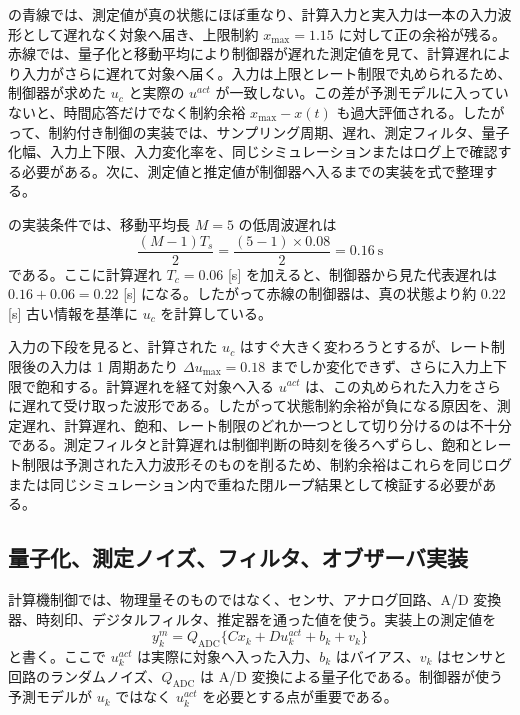  の青線では、測定値が真の状態にほぼ重なり、計算入力と実入力は一本の入力波形として遅れなく対象へ届き、上限制約 $x_{\max}=1.15$ に対して正の余裕が残る。赤線では、量子化と移動平均により制御器が遅れた測定値を見て、計算遅れにより入力がさらに遅れて対象へ届く。入力は上限とレート制限で丸められるため、制御器が求めた $u_c$ と実際の $u^{act}$ が一致しない。この差が予測モデルに入っていないと、時間応答だけでなく制約余裕 $x_{\max}-x(t)$ も過大評価される。したがって、制約付き制御の実装では、サンプリング周期、遅れ、測定フィルタ、量子化幅、入力上下限、入力変化率を、同じシミュレーションまたはログ上で確認する必要がある。次に、測定値と推定値が制御器へ入るまでの実装を式で整理する。

 の実装条件では、移動平均長 $M=5$ の低周波遅れは
\begin{equation}
  \frac{(M-1)T_s}{2}
  =\frac{(5-1)\times 0.08}{2}
  =0.16\ \mathrm{s}
\end{equation}
である。ここに計算遅れ $T_c=0.06$ [s] を加えると、制御器から見た代表遅れは $0.16+0.06=0.22$ [s] になる。したがって赤線の制御器は、真の状態より約 $0.22$ [s] 古い情報を基準に $u_c$ を計算している。

入力の下段を見ると、計算された $u_c$ はすぐ大きく変わろうとするが、レート制限後の入力は 1 周期あたり $\Delta u_{\max}=0.18$ までしか変化できず、さらに入力上下限で飽和する。計算遅れを経て対象へ入る $u^{act}$ は、この丸められた入力をさらに遅れて受け取った波形である。したがって状態制約余裕が負になる原因を、測定遅れ、計算遅れ、飽和、レート制限のどれか一つとして切り分けるのは不十分である。測定フィルタと計算遅れは制御判断の時刻を後ろへずらし、飽和とレート制限は予測された入力波形そのものを削るため、制約余裕はこれらを同じログまたは同じシミュレーション内で重ねた閉ループ結果として検証する必要がある。

\subsection{量子化、測定ノイズ、フィルタ、オブザーバ実装}

計算機制御では、物理量そのものではなく、センサ、アナログ回路、A/D 変換器、時刻印、デジタルフィルタ、推定器を通った値を使う。実装上の測定値を
\begin{equation}
  y_k^{m}=Q_{\mathrm{ADC}}\{Cx_k+Du_k^{act}+b_k+v_k\}
\end{equation}
と書く。ここで $u_k^{act}$ は実際に対象へ入った入力、$b_k$ はバイアス、$v_k$ はセンサと回路のランダムノイズ、$Q_{\mathrm{ADC}}$ は A/D 変換による量子化である。制御器が使う予測モデルが $u_k$ ではなく $u_k^{act}$ を必要とする点が重要である。

